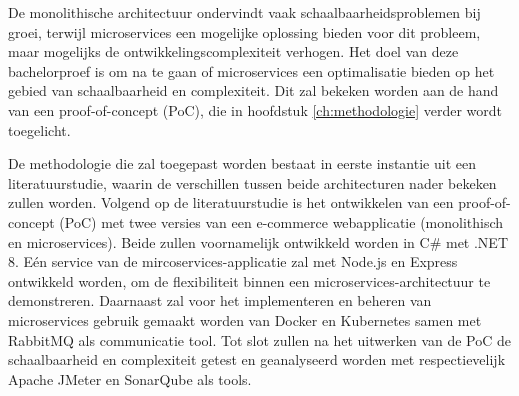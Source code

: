 De monolithische architectuur ondervindt vaak schaalbaarheidsproblemen bij groei, terwijl microservices een mogelijke oplossing bieden voor dit probleem, maar mogelijks de ontwikkelingscomplexiteit verhogen. Het doel van deze bachelorproef is om na te gaan of microservices een optimalisatie bieden op het gebied van schaalbaarheid en complexiteit. Dit zal bekeken worden aan de hand van een proof-of-concept (PoC), die in hoofdstuk \ref{ch:methodologie} verder wordt toegelicht.\newline

De methodologie die zal toegepast worden bestaat in eerste instantie uit een literatuurstudie, waarin de verschillen tussen beide architecturen nader bekeken zullen worden. Volgend op de literatuurstudie is het ontwikkelen van een proof-of-concept (PoC) met twee versies van een e-commerce webapplicatie (monolithisch en microservices). Beide zullen voornamelijk ontwikkeld worden in C\# met .NET 8. Eén service van de mircoservices-applicatie zal met Node.js en Express ontwikkeld worden, om de flexibiliteit binnen een microservices-architectuur te demonstreren. Daarnaast zal voor het implementeren en beheren van microservices gebruik gemaakt worden van Docker en Kubernetes samen met RabbitMQ als communicatie tool. Tot slot zullen na het uitwerken van de PoC de schaalbaarheid en complexiteit getest en geanalyseerd worden met respectievelijk Apache JMeter en SonarQube als tools.\newline
